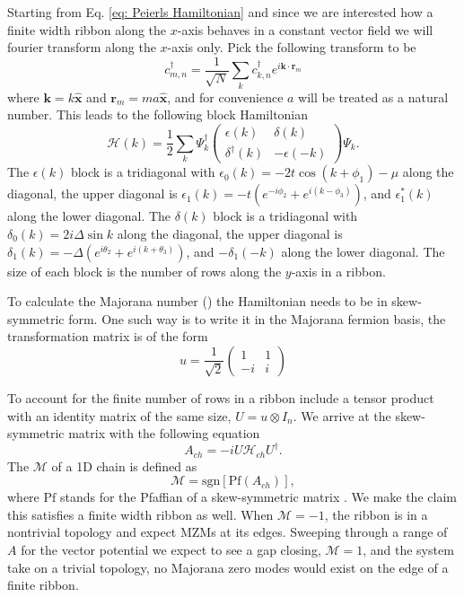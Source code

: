 \documentclass[aps,prb,showpacs,amsmath,twocolumn,amssymb,superscriptaddress]{revtex4-2}
\let\oldhat\hat
\renewcommand{\hat}[1]{\oldhat{\mathbf{#1}}}
\renewcommand{\vec}[1]{\mathbf{#1}}
\newcommand{\ham}{\mathcal{H}}
\newcommand{\cc}{c^{\dagger}}
\newcommand{\de}{\Delta}
\begin{document}
Starting from Eq. \ref{eq: Peierls Hamiltonian} and since we are interested how a finite width ribbon along the $x$-axis behaves in a constant vector field we will fourier transform along the $x$-axis only.
Pick the following transform to be
\begin{equation}
  \cc_{m,n} = \dfrac{1}{\sqrt{N}} \sum_{k} \cc_{k,n} e^{i \vec{k}\cdot\vec{r}_m}
\end{equation}
where $\vec{k}=k\hat{x}$ and $\vec{r}_m = ma\hat{x}$, and for convenience $a$ will be treated as a natural number.
This leads to the following block Hamiltonian
\begin{equation}
  \ham(k) = \dfrac{1}{2} \sum_k \Psi_k^\dagger \left(
    \begin{matrix}
      \epsilon(k) & \delta(k) \\
      \delta^\dagger(k) & -\epsilon(-k)
    \end{matrix} \right)
    \Psi_k.
\end{equation}
The $\epsilon(k)$ block is a tridiagonal with $\epsilon_0(k) = -2t\cos(k+\phi_1) - \mu$ along the diagonal, the upper diagonal is  $\epsilon_1(k) = -t(e^{-i\phi_2}+e^{i(k-\phi_3)})$, and $\epsilon_1^*(k)$ along the lower diagonal.
The $\delta(k)$ block is a tridiagonal with $\delta_0(k) = 2i\de \sin k $ along the diagonal, the upper diagonal is  $\delta_1(k) = -\de (e^{i\theta_2}+e^{i(k+\theta_3)})$, and $-\delta_1(-k)$ along the lower diagonal.
The size of each block is the number of rows along the $y$-axis in a ribbon.

To calculate the Majorana number () the Hamiltonian needs to be in skew-symmetric form.
One such way is to write it in the Majorana fermion basis, the transformation matrix is of the form
\begin{equation}
  u = \dfrac{1}{\sqrt{2}} \left(
  \begin{matrix}
    1 & 1 \\
    -i & i
  \end{matrix} \right)
\end{equation}

To account for the finite number of rows in a ribbon include a tensor product with an identity matrix of the same size, $U = u \otimes I_n$.
We arrive at the skew-symmetric matrix with the following equation
\begin{equation}
  A_{ch} = -i U \ham_{ch} U^{\dagger}.
\end{equation}
The $\mathcal{M}$ of a 1D chain is defined as
\begin{equation}
  \mathcal{M} = \text{sgn}[\text{Pf}(A_{ch})],
\end{equation}
where $\text{Pf}$ stands for the Pfaffian of a skew-symmetric matrix \cite{kitaevUnpairedMajoranaFermions2001}.
We make the claim this satisfies a finite width ribbon as well.
When $\mathcal{M} = -1$, the ribbon is in a nontrivial topology and expect MZMs at its edges.
Sweeping through a range of $A$ for the vector potential we expect to see a gap closing, $\mathcal{M} = 1$, and the system take on a trivial topology, no Majorana zero modes would exist on the edge of a finite ribbon.
\end{document}
